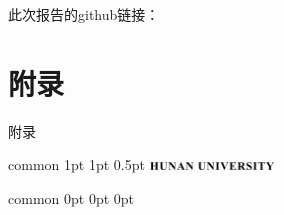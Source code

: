 \documentclass[
    report,     %
    oneside,    %
    UTF8,       %
    zihao=-4    %
]{config} %
\begin{document}
此次报告的github链接：



\begin{references}
\end{references}


\StartAppendix %

\chapter{附录}

附录


\Header
    {common} %
    {1pt} %
    {1pt} %
    {0.5pt} %
    {} %
    {\includegraphics[width=0.25\textwidth]{figures/logos/HNU-title-EN.png}} %
    {} %


\Footer
    {common} %
    {0pt} %
    {0pt} %
    {0pt} %
    {} %
    {\thepage} %
    {} %




\end{document}
